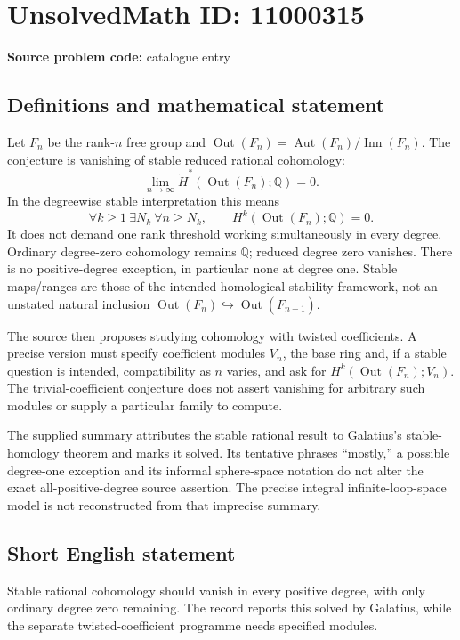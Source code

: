 \documentclass[11pt]{article}
\newcommand{\Q}{\mathbb{Q}}
\begin{document}
\section*{UnsolvedMath ID: 11000315}
\textbf{Source problem code:} catalogue entry
\subsection{Definitions and mathematical statement}
Let \(F_n\) be the rank-\(n\) free group and \(\operatorname{Out}(F_n)=\operatorname{Aut}(F_n)/\operatorname{Inn}(F_n)\). The conjecture is vanishing of stable reduced rational cohomology:
\[\lim_{n\to\infty}\widetilde H^*(\operatorname{Out}(F_n);\Q)=0.\]
In the degreewise stable interpretation this means
\[\forall k\geq1\ \exists N_k\ \forall n\geq N_k,\qquad
H^k(\operatorname{Out}(F_n);\Q)=0.\]
It does not demand one rank threshold working simultaneously in every degree. Ordinary degree-zero cohomology remains \(\Q\); reduced degree zero vanishes. There is no positive-degree exception, in particular none at degree one. Stable maps/ranges are those of the intended homological-stability framework, not an unstated natural inclusion \(\operatorname{Out}(F_n)\hookrightarrow\operatorname{Out}(F_{n+1})\).

The source then proposes studying cohomology with twisted coefficients. A precise version must specify coefficient modules \(V_n\), the base ring and, if a stable question is intended, compatibility as \(n\) varies, and ask for \(H^k(\operatorname{Out}(F_n);V_n)\). The trivial-coefficient conjecture does not assert vanishing for arbitrary such modules or supply a particular family to compute.

The supplied summary attributes the stable rational result to Galatius's stable-homology theorem and marks it solved. Its tentative phrases ``mostly,'' a possible degree-one exception and its informal sphere-space notation do not alter the exact all-positive-degree source assertion. The precise integral infinite-loop-space model is not reconstructed from that imprecise summary.
\subsection{Short English statement}
Stable rational cohomology should vanish in every positive degree, with only ordinary degree zero remaining. The record reports this solved by Galatius, while the separate twisted-coefficient programme needs specified modules.
\end{document}
